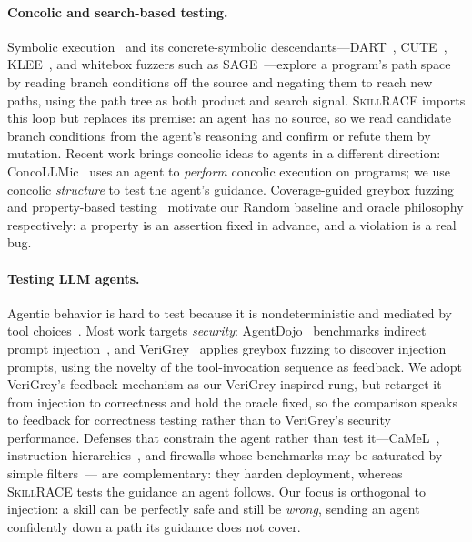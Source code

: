 \documentclass[acmsmall,screen,review,anonymous]{acmart}
\newcommand{\tool}{\textsc{SkillRACE}\xspace}
\begin{document}
\paragraph{Concolic and search-based testing.} Symbolic execution~\cite{king1976symbolic}
and its concrete-symbolic descendants---DART~\cite{dart}, CUTE~\cite{sen2005cute},
KLEE~\cite{klee}, and whitebox fuzzers such as SAGE~\cite{godefroid2008sage}---explore a
program's path space by reading branch conditions off the source and negating them to
reach new paths, using the path tree as both product and search signal. \tool imports this
loop but replaces its premise: an agent has no source, so we read candidate branch
conditions from the agent's reasoning and confirm or refute them by mutation. Recent work
brings concolic ideas to agents in a different direction: ConcoLLMic~\cite{concollmic} uses
an agent to \emph{perform} concolic execution on programs; we use concolic \emph{structure}
to test the agent's guidance. Coverage-guided greybox fuzzing~\cite{afl,ossfuzz} and
property-based testing~\cite{claessen2000quickcheck} motivate our Random baseline and oracle
philosophy respectively: a property is an assertion fixed in advance, and a violation is a
real bug.

\paragraph{Testing LLM agents.} Agentic behavior is hard to test because it is
nondeterministic and mediated by tool choices~\cite{verigrey}. Most work targets
\emph{security}: AgentDojo~\cite{debenedetti2024agentdojo} benchmarks indirect prompt
injection~\cite{greshake2023not,owasp2025llm01,liu2025youraishell}, and
VeriGrey~\cite{verigrey} applies greybox fuzzing to discover injection prompts, using the
novelty of the tool-invocation sequence as feedback. We adopt VeriGrey's feedback mechanism
as our VeriGrey-inspired rung, but retarget it from injection to correctness and hold the oracle
fixed, so the comparison speaks to feedback for correctness testing rather than to
VeriGrey's security performance. Defenses that constrain the agent rather than test
it---CaMeL~\cite{debenedetti2025camel}, instruction hierarchies~\cite{wallace2024instructionhierarchy},
and firewalls whose benchmarks may be saturated by simple filters~\cite{bhagwatkar2025firewalls}---%
are complementary: they harden deployment, whereas \tool tests the guidance an agent
follows. Our focus is orthogonal to injection: a skill can be perfectly safe and still be
\emph{wrong}, sending an agent confidently down a path its guidance does not cover.
\end{document}
